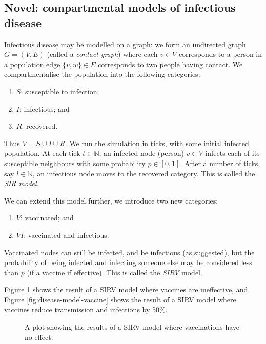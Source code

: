 \subsection{Novel: compartmental models of infectious disease}

Infectious disease may be modelled on a graph: we form an undirected graph $G = (V,E)$ (called a \emph{contact graph}) where each $v \in V$ corresponds to a person in a population edge $\{v,w\} \in E$ corresponds to two people having contact. We compartmentalise the population into the following categories:
\begin{enumerate}
    \item $S$: susceptible to infection;
    \item $I$: infectious; and
    \item $R$: recovered.
\end{enumerate}
Thus $V = S \cup I \cup R$. We run the simulation in ticks, with some initial infected population. At each tick $t \in \mathbb N$, an infected node (person) $v \in V$ infects each of its susceptible neighbours with some probability $p \in [0,1]$. After a number of ticks, say $l \in \mathbb N$, an infectious node moves to the recovered category. This is called the \emph{SIR model}.

We can extend this model further, we introduce two new categories:
\begin{enumerate}
    \item $V$: vaccinated; and
    \item $VI$: vaccinated and infectious.
\end{enumerate}
Vaccinated nodes can still be infected, and be infectious (as suggested), but the probability of being infected and infecting someone else may be considered less than $p$ (if a vaccine if effective). This is called the \emph{SIRV} model. 

Figure \ref{fig:disease-model-no-vaccine} shows the result of a SIRV model where vaccines are ineffective, and Figure \ref{fig:disease-model-vaccine} shows the result of a SIRV model where vaccines reduce transmission and infections by 50\%. 

\begin{figure}
    \caption{A plot showing the results of a SIRV model where vaccinations have no effect.}
    \label{fig:disease-model-no-vaccine}
\end{figure}

